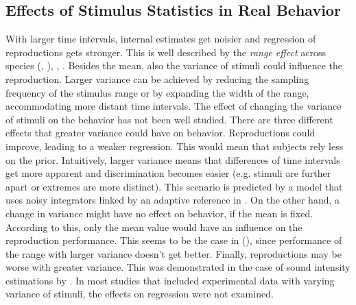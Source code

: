 \documentclass[10pt]{article}
\begin{document}
\subsection{Effects of Stimulus Statistics in Real Behavior}
With larger time intervals, internal estimates get noisier and regression of reproductions gets stronger. This is well described by the \textit{range effect} across species (\cite{Cicchini2012}, \cite{Sohn2019}), \cite{Henke2021}, \cite{Henke2022}. 
Besides the mean, also the variance of stimuli could influence the reproduction.
Larger variance can be achieved by reducing the sampling frequency of the stimulus range or by expanding the width of the range, accommodating more distant time intervals. 
The effect of changing the variance of stimuli on the behavior has not been well studied.
There are three different effects that greater variance could have on behavior. 
Reproductions could improve, leading to a weaker regression. This would mean that subjects rely less on the prior. 
Intuitively, larger variance means that differences of time intervals get more apparent and discrimination becomes easier (e.g. stimuli are further apart or extremes are more distinct). 
This scenario is predicted by a model that uses noisy integrators linked by an adaptive reference in \cite{Thurley2016}.
On the other hand, a change in variance might have no effect on behavior, if the mean is fixed. According to this, only the mean value would have an influence on the reproduction performance.
This seems to be the case in \citeauthor{Petzschner2012} (\citeyear{Petzschner2012}), since performance of the range with larger variance doesn't get better. 
Finally, reproductions may be worse with greater variance. This was demonstrated in the case of sound intensity estimations by \cite{Teghtsoonian78}.
In most studies that included experimental data with varying variance of stimuli, the effects on regression were not examined. 
\end{document}
